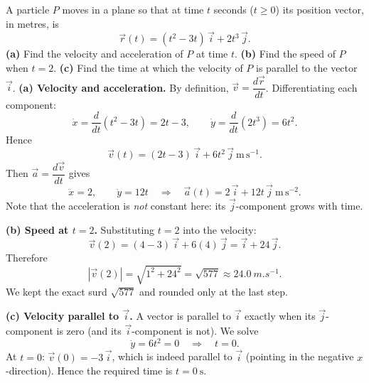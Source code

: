 \documentclass[11pt]{article}
\begin{document}
\begin{exoresolu}[Motion with $\vec{r}(t) = (t^2 - 3t)\,\vec{i} + 2t^3\,\vec{j}$]
A particle $P$ moves in a plane so that at time $t$ seconds ($t \geq 0$) its position vector, in metres, is
\[
\vec{r}(t) = (t^2 - 3t)\,\vec{i} + 2t^3\,\vec{j}.
\]
\textbf{(a)} Find the velocity and acceleration of $P$ at time $t$.\quad
\textbf{(b)} Find the speed of $P$ when $t = 2$.\quad
\textbf{(c)} Find the time at which the velocity of $P$ is parallel to the vector $\vec{i}$.
\tcblower
\textbf{(a) Velocity and acceleration.} By definition, $\vec{v} = \dfrac{d\vec{r}}{dt}$. Differentiating each component:
\[
\dot{x} = \frac{d}{dt}\left(t^2 - 3t\right) = 2t - 3, \qquad
\dot{y} = \frac{d}{dt}\left(2t^3\right) = 6t^2.
\]
Hence
\[
\vec{v}(t) = (2t - 3)\,\vec{i} + 6t^2\,\vec{j} \ \mathrm{m\,s^{-1}}.
\]
Then $\vec{a} = \dfrac{d\vec{v}}{dt}$ gives
\[
\ddot{x} = 2, \qquad \ddot{y} = 12t
\quad\Longrightarrow\quad
\vec{a}(t) = 2\,\vec{i} + 12t\,\vec{j} \ \mathrm{m\,s^{-2}}.
\]
Note that the acceleration is \emph{not} constant here: its $\vec{j}$-component grows with time.

\textbf{(b) Speed at $t = 2$.} Substituting $t = 2$ into the velocity:
\[
\vec{v}(2) = (4 - 3)\,\vec{i} + 6(4)\,\vec{j} = \vec{i} + 24\,\vec{j}.
\]
Therefore
\[
|\vec{v}(2)| = \sqrt{1^2 + 24^2} = \sqrt{577} \approx \SI{24.0}{m.s^{-1}}.
\]
We kept the exact surd $\sqrt{577}$ and rounded only at the last step.

\textbf{(c) Velocity parallel to $\vec{i}$.} A vector is parallel to $\vec{i}$ exactly when its $\vec{j}$-component is zero (and its $\vec{i}$-component is not). We solve
\[
\dot{y} = 6t^2 = 0 \quad\Longrightarrow\quad t = 0.
\]
At $t = 0$: $\vec{v}(0) = -3\,\vec{i}$, which is indeed parallel to $\vec{i}$ (pointing in the negative $x$-direction). Hence the required time is $t = 0\ \mathrm{s}$.
\end{exoresolu}
\end{document}
